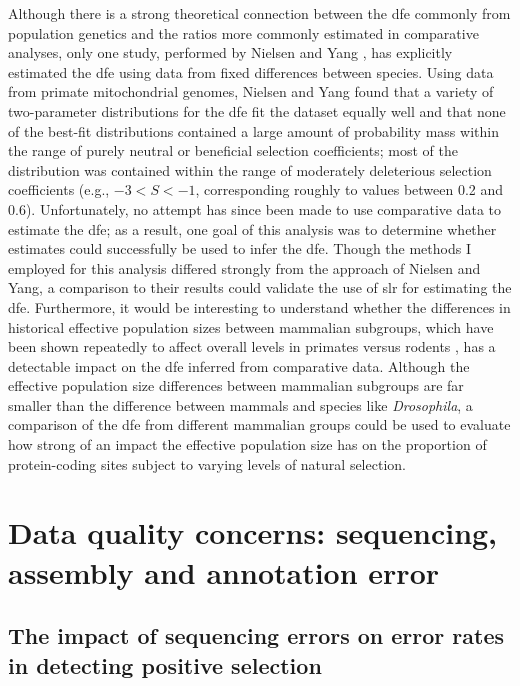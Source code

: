 Although there is a strong theoretical connection between the \ac{dfe}
commonly from population genetics and the \dnds ratios more commonly
estimated in comparative analyses, only one study, performed by
Nielsen and Yang \citeyearpar{Nielsen2003}, has explicitly estimated
the \ac{dfe} using data from fixed differences between species. Using
data from primate mitochondrial genomes, Nielsen and Yang found that a
variety of two-parameter distributions for the \ac{dfe} fit the
dataset equally well and that none of the best-fit distributions
contained a large amount of probability mass within the range of
purely neutral or beneficial selection coefficients; most of the
distribution was contained within the range of moderately deleterious
selection coefficients (e.g., $-3<S<-1$, corresponding roughly to
\dnds values between 0.2 and 0.6). Unfortunately, no attempt has since
been made to use comparative data to estimate the \ac{dfe}; as a
result, one goal of this analysis was to determine whether \sw
estimates could successfully be used to infer the \ac{dfe}. Though the
methods I employed for this analysis differed strongly from the
approach of Nielsen and Yang, a comparison to their results could
validate the use of \ac{slr} for estimating the \ac{dfe}. Furthermore,
it would be interesting to understand whether the differences in
historical effective population sizes between mammalian subgroups,
which have been shown repeatedly to affect overall \dnds levels in
primates versus rodents \citep{Kosiol2008,Ellegren2009}, has a
detectable impact on the \ac{dfe} inferred from comparative
data. Although the effective population size differences between
mammalian subgroups are far smaller than the difference between
mammals and species like \emph{Drosophila}, a comparison of the
\ac{dfe} from different mammalian groups could be used to evaluate how
strong of an impact the effective population size has on the
proportion of protein-coding sites subject to varying levels of
natural selection.

\section{Data quality concerns: sequencing, assembly and annotation error}

\subsection{The impact of sequencing errors on error rates in detecting positive selection}
\label{section_error_impact}

